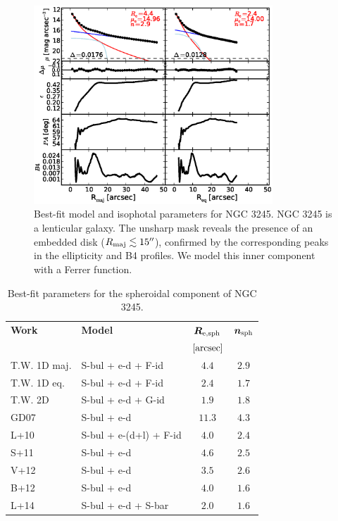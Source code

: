 \documentclass[preprint2]{emulateapj}
\newcommand{\fitfigurewidth}{0.8\textwidth}
\begin{document}
  \begin{figure}[h]
  \begin{center}
  \includegraphics[width=\fitfigurewidth]{images/n3245_1Dfit.eps}
  \caption{Best-fit model and isophotal parameters for NGC 3245.
  NGC 3245 is a lenticular galaxy.
  The unsharp mask reveals the presence of an embedded disk ($R_{\rm maj} \lesssim 15''$), 
  confirmed by the corresponding peaks in the ellipticity and B4 profiles.
  We model this inner component with a Ferrer function. 
  }
  \end{center}
  \end{figure}

  \begin{table}[h]
  \small
  \caption{Best-fit parameters for the spheroidal component of NGC 3245.}
  \begin{center}
  \begin{tabular}{llcc}
  \hline
  {\bf Work} & {\bf Model}   & $\bm R_{\rm e,sph}$    & $\bm n_{\rm sph}$ \\
    &  &  $[\rm arcsec]$ & \\
  \hline
  T.W. 1D maj. & S-bul + e-d + F-id & $4.4$  &  $2.9$ \\
  T.W. 1D eq.  & S-bul + e-d + F-id & $2.4$  &  $1.7$ \\
  T.W. 2D      & S-bul + e-d + G-id & $1.9$  &  $1.8$ \\
  \hline
  GD07         & S-bul + e-d		& $11.3$ &  $4.3$ \\
  L+10         & S-bul + e-(d+l) + F-id & $4.0$  &  $2.4$ \\
  S+11         & S-bul + e-d		& $4.6$  &  $2.5$ \\
  V+12         & S-bul + e-d		& $3.5$  &  $2.6$ \\
  B+12         & S-bul + e-d		& $4.0$  &  $1.6$ \\
  L+14         & S-bul + e-d + S-bar	& $2.0$  &  $1.6$ \\
  \hline
  \end{tabular}
  \end{center}
  \label{tab:n3245}
  \end{table}
\end{document}
